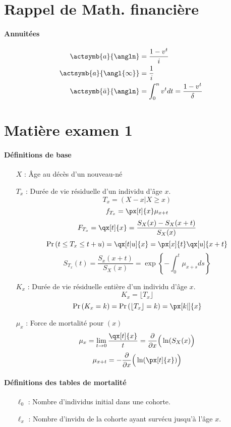 \documentclass[10pt, french]{article}
\begin{document}
\begin{multicols*}{3} %
\section*{Rappel de Math. financière}
\paragraph{Annuitées}
\begin{align*}
	\actsymb{a}{\angln} &= \frac{1 - v^t}{i} \\
	\actsymb{a}{\angl{\infty}} &= \frac{1}{i} \\
	\actsymb{\bar{a}}{\angln} &= \int_0^n v^t dt = \frac{1 - v^t}{\delta}
\end{align*}

\section{Matière examen 1}
\paragraph{Définitions de base}
\begin{itemize}
\item[$X$ : ] Âge au décès d'un nouveau-né
\item[$T_x$ : ] Durée de vie résiduelle d'un individu d'âge $x$.
\[T_x = (X-x | X \geq x) \]
\[ f_{T_x} = \px[t]{x} \mu_{x+t} \]
\[ F_{T_x}   =\qx[t]{x} = \frac{S_X(x) - S_X(x+t)}{S_X(x)}  \]
\[ \prob{t \leq T_x \leq t+u} = \qx[t|u]{x} = \px[x]{t} \qx[u]{x+t} \]
\[S_{T_x}(t) = \frac{S_x(x+t)}{S_X(x)} = \exp \left\{ - \int_{0}^{t} \mu_{x+s} ds \right\}  \]
\item[$K_x$ : ] Durée de vie résiduelle entière d'un individu d'âge $x$.
\[K_x = \lfloor T_x \rfloor \]
\[\prob{K_x = k} = \prob{\lfloor T_x \rfloor = k} = \px[k|]{x} \]

\item[$\mu_x$ : ] Force de mortalité pour $(x)$
\[\mu_x = \lim_{t \to 0} \frac{\qx[t]{x}}{t} = \derivee{x} \Big( \ln(S_X(x)\Big) \]
\[\mu_{x+t} = - \derivee{x} \Big( \ln ( \px[t]{x}) \Big) \]
\end{itemize}

\paragraph{Définitions des tables de mortalité}
\begin{itemize}
\item[$\ell_0$ : ] Nombre d'individus initial dans une cohorte.
\item[$\ell_x$ : ] Nombre d'invidu de la cohorte ayant survécu jusqu'à l'âge $x$.


\end{itemize}
\end{multicols*}
\end{document}
